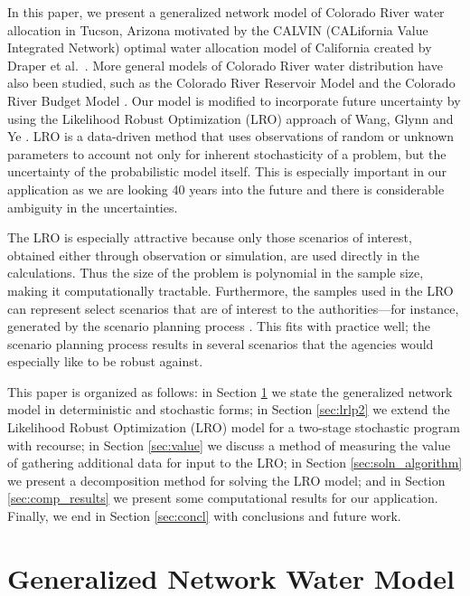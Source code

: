 \documentclass{iserc}
\begin{document}
In this paper, we present a generalized network model of Colorado River water allocation in Tucson, Arizona motivated by the CALVIN (CALifornia Value Integrated Network) optimal water allocation model of California created by Draper et al.\ \cite{draper_etal_03}.
More general models of Colorado River water distribution have also been studied, such as the Colorado River Reservoir Model \cite{christensen2004effects} and the Colorado River Budget Model \cite{barnett2009sustainable}.
Our model is modified to incorporate future uncertainty by using the Likelihood Robust Optimization (LRO) approach of Wang, Glynn and Ye \cite{wang2010likelihood}.
LRO is a data-driven method that uses observations of random or unknown parameters to account not only for inherent stochasticity of a problem, but the uncertainty of the probabilistic model itself.
This is especially important in our application as we are looking 40 years into the future and there is considerable ambiguity in the uncertainties.

The LRO is especially attractive because only those scenarios of interest, obtained either through observation or simulation, are used directly in the calculations.
Thus the size of the problem is polynomial in the sample size, making it computationally tractable.
Furthermore, the samples used in the LRO can represent select scenarios that are of interest to the authorities---for instance, generated by the scenario planning process \cite{cityofTucsonWaterPlan,usbr_11}.
This fits with practice well; the scenario planning process results in several scenarios that the agencies would especially like to be robust against.

This paper is organized as follows: in Section \ref{sec:network_model} we state the generalized network model in deterministic and stochastic forms; in Section \ref{sec:lrlp2} we extend the Likelihood Robust Optimization (LRO) model for a two-stage stochastic program with recourse; in Section \ref{sec:value} we discuss a method of measuring the value of gathering additional data for input to the LRO; in Section \ref{sec:soln_algorithm} we present a decomposition method for solving the LRO model; and in Section \ref{sec:comp_results} we present some computational results for our application. Finally, we end in Section \ref{sec:concl} with conclusions and future work.


\section{Generalized Network Water Model} 
\label{sec:network_model}
\end{document}
